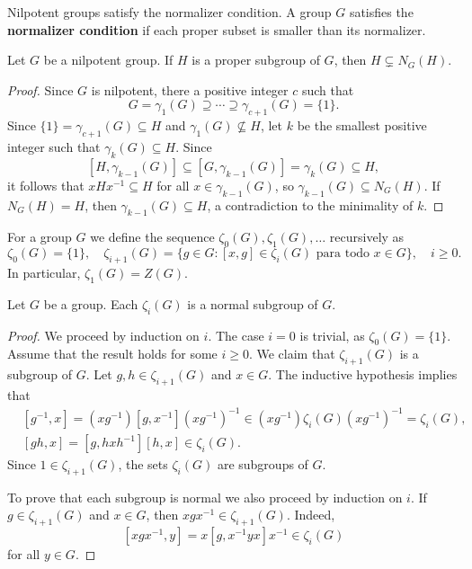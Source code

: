 Nilpotent groups satisfy the normalizer condition. A group 
$G$ satisfies the \textbf{normalizer condition} if each proper subset is smaller 
than its normalizer. 

\begin{lemma}
	\label{lem:normalizer}
	Let $G$ be a nilpotent group. If $H$ is a proper subgroup of $G$, then 
	$H\subsetneq N_G(H)$.
\end{lemma}

\begin{proof}
	Since $G$ is nilpotent, there a positive integer $c$ such that 
	\[
	G=\gamma_1(G)\supseteq\cdots\supseteq\gamma_{c+1}(G)=\{1\}.
	\]
	Since 
	$\{1\}=\gamma_{c+1}(G)\subseteq H$ and $\gamma_1(G)\not\subseteq H$, 
	let $k$ be the smallest positive integer such that $\gamma_k(G)\subseteq H$. Since 
	\[
		[H,\gamma_{k-1}(G)]\subseteq [G,\gamma_{k-1}(G)]=\gamma_k(G)\subseteq H,
	\]
	it follows that 
	$xHx^{-1}\subseteq H$ for all $x\in\gamma_{k-1}(G)$,
	so  $\gamma_{k-1}(G)\subseteq N_G(H)$. If $N_G(H)=H$, then 
	$\gamma_{k-1}(G)\subseteq H$, a contradiction to the minimality of $k$. 
\end{proof}



For a group $G$ we define the sequence $\zeta_0(G),\zeta_1(G),\dots$
recursively as 
\[
	\zeta_0(G)=\{1\},\quad
	\zeta_{i+1}(G)=\{g\in G:[x,g]\in\zeta_{i}(G)\text{ para todo $x\in G$}\},\quad i\geq 0.
\]
In particular, $\zeta_1(G)=Z(G)$.

\begin{lemma}
	\label{lem:central_ascendente}
	Let $G$ be a group. Each $\zeta_i(G)$ is a normal
	subgroup of $G$. 
\end{lemma}

\begin{proof}
	We proceed by induction on $i$. The case $i=0$ is trivial, as 
	$\zeta_0(G)=\{1\}$.  Assume that the result holds for some $i\geq0$.
	We claim that $\zeta_{i+1}(G)$ is a subgroup of $G$. 
	Let $g,h\in \zeta_{i+1}(G)$ and $x\in G$. The inductive hypothesis implies that 
	\begin{align*}
	&[g^{-1},x]=(xg^{-1})[g,x^{-1}](xg^{-1})^{-1}\in (xg^{-1})\zeta_i(G)(xg^{-1})^{-1}=\zeta_i(G),\\
	&[gh,x]=[g,hxh^{-1}][h,x]\in \zeta_{i}(G).
	\end{align*}
	Since $1\in\zeta_{i+1}(G)$, the sets $\zeta_i(G)$ are subgroups of $G$. 
	
	To prove 
	that each subgroup is normal we also proceed by induction on $i$. 
	If $g\in\zeta_{i+1}(G)$ and $x\in G$, then $xgx^{-1}\in\zeta_{i+1}(G)$. Indeed,  
	\[
	[xgx^{-1},y]=x[g,x^{-1}yx]x^{-1}\in\zeta_{i}(G)
	\]
	for all $y\in G$.
\end{proof}


